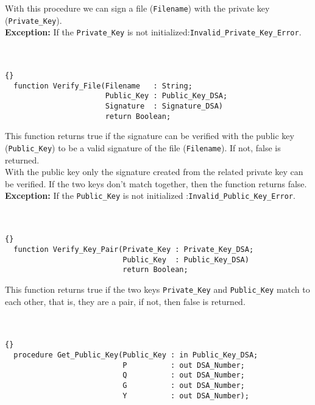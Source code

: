 With this procedure we can sign a file (\texttt{Filename}) with the private key (\texttt{Private\_Key}).\\
\textbf{Exception:}
If the \texttt{Private\_Key} is not initialized:\quad \texttt{Invalid\_Private\_Key\_Error}.\\
\hline \\ \ \\
\begin{lstlisting}{}
  function Verify_File(Filename   : String;
                       Public_Key : Public_Key_DSA;
                       Signature  : Signature_DSA) 
                       return Boolean;
\end{lstlisting}
This function returns true if the signature can be verified with the public key (\texttt{Public\_Key}) to be a valid signature of the file (\texttt{Filename}). If not, false is returned.\\
With the public key only the signature created from the related private key can be verified. If the two keys don't match together, then the function returns false.\\
\textbf{Exception:}
If the \texttt{Public\_Key} is not initialized :\quad \texttt{Invalid\_Public\_Key\_Error}.\\
\hline \\ \ \\
\begin{lstlisting}{}
  function Verify_Key_Pair(Private_Key : Private_Key_DSA;
                           Public_Key  : Public_Key_DSA) 
                           return Boolean;
\end{lstlisting}
This function returns true if the two keys \texttt{Private\_Key} and \texttt{Public\_Key} match to each other, that is, they are a pair, if not, then false is returned.\\
\hline \\ \ \\
\begin{lstlisting}{}
  procedure Get_Public_Key(Public_Key : in Public_Key_DSA;
                           P          : out DSA_Number;
                           Q          : out DSA_Number;
                           G          : out DSA_Number;
                           Y          : out DSA_Number);
\end{lstlisting}
